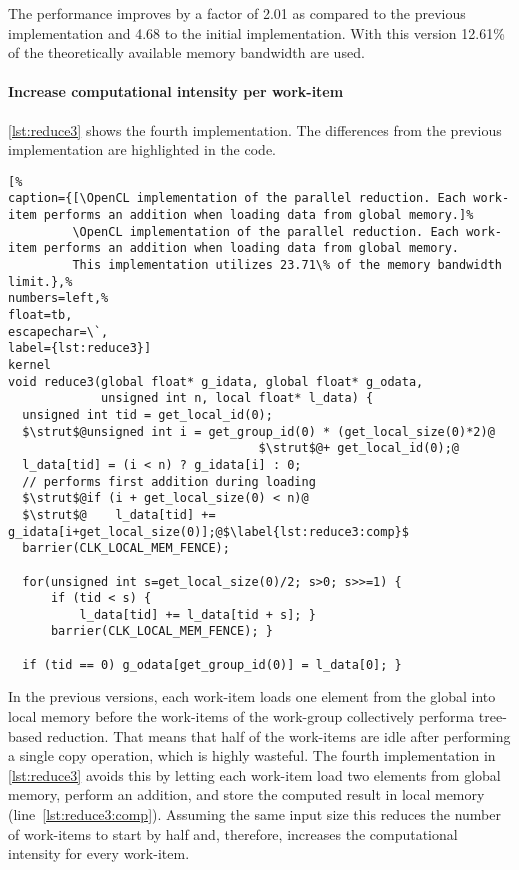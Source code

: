 The performance improves by a factor of 2.01 as compared to the previous implementation and 4.68 to the initial implementation.
With this version 12.61\% of the theoretically available memory bandwidth are used.



\FloatBarrier
\newpage

\paragraph{Increase computational intensity per work-item}

\autoref{lst:reduce3} shows the fourth implementation.
The differences from the previous implementation are highlighted in the code.
\begin{lstlisting}[%
caption={[\OpenCL implementation of the parallel reduction. Each work-item performs an addition when loading data from global memory.]%
         \OpenCL implementation of the parallel reduction. Each work-item performs an addition when loading data from global memory.
         This implementation utilizes 23.71\% of the memory bandwidth limit.},%
numbers=left,%
float=tb,
escapechar=\`,
label={lst:reduce3}]
kernel
void reduce3(global float* g_idata, global float* g_odata,
             unsigned int n, local float* l_data) {
  unsigned int tid = get_local_id(0);
  $\strut$@unsigned int i = get_group_id(0) * (get_local_size(0)*2)@
                                   $\strut$@+ get_local_id(0);@
  l_data[tid] = (i < n) ? g_idata[i] : 0;
  // performs first addition during loading
  $\strut$@if (i + get_local_size(0) < n)@
  $\strut$@    l_data[tid] += g_idata[i+get_local_size(0)];@$\label{lst:reduce3:comp}$
  barrier(CLK_LOCAL_MEM_FENCE);

  for(unsigned int s=get_local_size(0)/2; s>0; s>>=1) {
      if (tid < s) {
          l_data[tid] += l_data[tid + s]; }
      barrier(CLK_LOCAL_MEM_FENCE); }

  if (tid == 0) g_odata[get_group_id(0)] = l_data[0]; }
\end{lstlisting}

In the previous versions, each work-item loads one element from the global into local memory before the work-items of the work-group collectively performa tree-based reduction.
That means that half of the work-items are idle after performing a single copy operation, which is highly wasteful.
The fourth implementation in \autoref{lst:reduce3} avoids this by letting each work-item load two elements from global memory, perform an addition, and store the computed result in local memory (line~\ref{lst:reduce3:comp}).
Assuming the same input size this reduces the number of work-items to start by half and, therefore, increases the computational intensity for every work-item.

